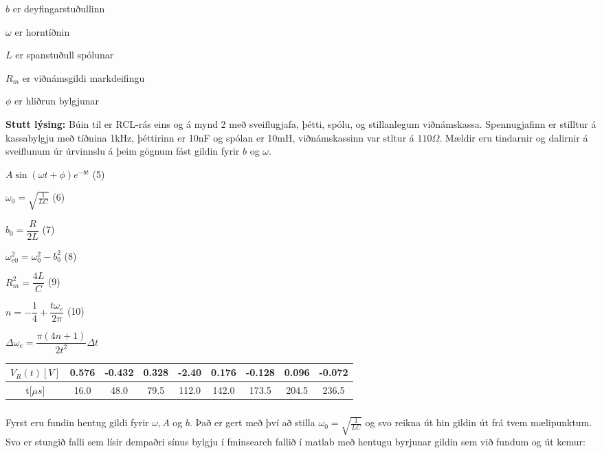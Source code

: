 \documentclass[12pt]{article}
\begin{document}
$ b$ er deyfingarstuðullinn


$ \omega$ er horntíðnin 


$ L $ er spanstuðull spólunar


$ R_m $ er viðnámsgildi markdeifingu


$ \phi $ er hliðrun bylgjunar




\bigskip

\textbf{Stutt lýsing:}
Búin til er RCL-rás eins og á mynd 2 með sveiflugjafa, þétti, spólu, og stillanlegum viðnámskassa. 
Spennugjafinn er stilltur á kassabylgju með tíðnina 1kHz,
þéttirinn er 10nF og spólan er 10mH, viðnámskassinn var stltur á $110 \Omega$. 
Mældir eru tindarnir og dalirnir á sveiflunum úr úrvinnslu á þeim
gögnum fást gildin fyrir $b$ og $\omega$.



\bigskip
$A\sin(\omega t + \phi)e^{-b t}$ (5)

\bigskip

$ \omega_0 = \sqrt{\frac{1}{LC}}$ (6)

\bigskip

$ b_0 = \dfrac{R}{2L}$ (7)

\bigskip
$ \omega_{e0}^2 = \omega_0^2-b_0^2 $ (8)

\bigskip

$ R_m^2 = \dfrac{4L}{C}$ (9)

\bigskip
$ n = -\dfrac{1}{4}+ \dfrac{t\omega _e}{2\pi} $ (10)

\bigskip
$\Delta \omega_e = \dfrac{\pi (4n+1)}{2t^2}\Delta t$

  
\bigskip

\begin{table}[H]
    \begin{tabular}{|c|c|c|c|c|c|c|c|c|}
    \hline
    $V_R(t) [V]$  & 0.576 & -0.432 & 0.328 & -2.40 & 0.176 & -0.128 & 0.096 & -0.072 \\
    \hline
    t[$\mu s$]    & 16.0 & 48.0 & 79.5 & 112.0 & 142.0 & 173.5 & 204.5 & 236.5 \\
    \hline
    \end{tabular}
\end{table}


\subsubsection{}
Fyrst eru fundin hentug gildi fyrir $\omega, A$ og $b$. Það er gert með því að stilla $\omega_0=\sqrt{\frac{1}{LC}}$ 
og svo reikna út hin gildin út frá tvem mælipunktum. Svo er stungið falli sem lísir dempaðri sínus bylgju 
í fminsearch fallið í matlab með hentugu byrjunar gildin sem við fundum og út kemur:
\end{document}
